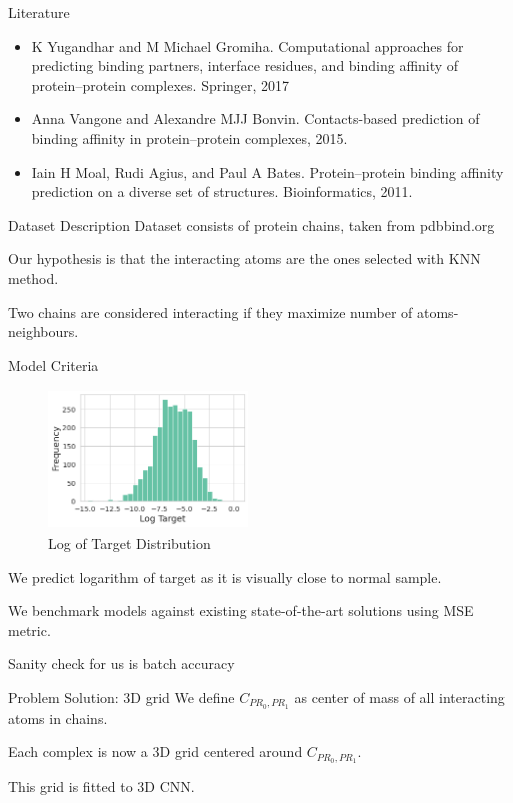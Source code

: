 \documentclass{beamer}
\begin{document}
\begin{frame}{Literature}
\begin{itemize}
        \item K Yugandhar and M Michael Gromiha. Computational approaches for predicting binding partners, interface residues, and binding affinity of protein–protein complexes. Springer, 2017 
        \item Anna Vangone and Alexandre MJJ Bonvin. Contacts-based prediction of binding affinity in protein–protein complexes, 2015. 
        \item Iain H Moal, Rudi Agius, and Paul A Bates. Protein–protein binding affinity prediction on a diverse set of structures. Bioinformatics, 2011.
\end{itemize}
\end{frame}

\begin{frame}{Dataset Description}
Dataset consists of protein chains, taken from pdbbind.org
\bigskip

Our hypothesis is that the interacting atoms are the ones selected with KNN method.
\bigskip

Two chains are considered interacting if they maximize number of atoms-neighbours.
\end{frame}

\begin{frame}{Model Criteria}
\begin{figure}
\includegraphics[width=200px, height=140px]{logM.png}
\caption{\label{fig:your-figure}Log of Target Distribution}
\end{figure}

We predict logarithm of target as it is visually close to normal sample.

We benchmark models against existing state-of-the-art solutions using MSE metric.

Sanity check for us is batch accuracy
\end{frame}

\begin{frame}{Problem Solution: 3D grid}
We define $C_{PR_0, PR_1}$ as center of mass of all interacting atoms in chains.
\bigskip

Each complex is now a 3D grid centered around $C_{PR_0, PR_1}$.
\bigskip

This grid is fitted to 3D CNN.
\end{frame}
\end{document}
